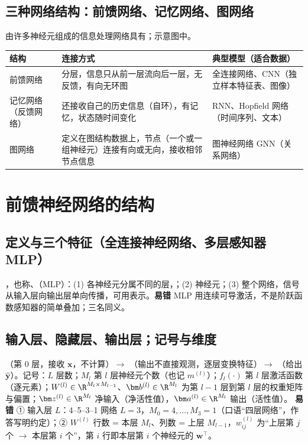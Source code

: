 \subsection{三种网络结构：前馈网络、记忆网络、图网络}
由许多神经元组成的信息处理网络具有；示意图中。
\begin{center}\small\renewcommand{\arraystretch}{1.1}
\begin{tabularx}{\linewidth}{@{}p{3.1cm}Lp{4.6cm}@{}}
\toprule
结构 & 连接方式 & 典型模型（适合数据） \\
\midrule
前馈网络 & 分层，信息只从前一层流向后一层，无反馈，有向无环图 & 全连接网络、CNN（独立样本特征表、图像） \\
记忆网络（反馈网络） & 还接收自己的历史信息（自环），有记忆，状态随时间变化 & RNN、Hopfield 网络（时间序列、文本） \\
图网络 & 定义在图结构数据上，节点（一个或一组神经元）连接有向或无向，接收相邻节点信息 & 图神经网络 GNN（关系网络） \\
\bottomrule
\end{tabularx}
\end{center}

\section{前馈神经网络的结构}

\subsection{定义与三个特征（全连接神经网络、多层感知器 MLP）}
，也称、（MLP）：(1) 各神经元分属不同的层，；(2) 神经元；(3) 整个网络，信号从输入层向输出层单向传播，可用表示。\textbf{易错} MLP 用连续可导激活，不是阶跃函数感知器的简单叠加；三名同义。

\subsection{输入层、隐藏层、输出层；记号与维度}
（第 0 层，接收 $\bm x$，不计算）$\to$ （输出不直接观测，逐层变换特征）$\to$ （给出 $\hat{\bm y}$）。记号：$L$ 层数；$M_l$ 第 $l$ 层神经元个数（也记 $m^{(l)}$）；$f_l(\cdot)$ 第 $l$ 层激活函数（逐元素）；$W^{(l)}\in\R^{M_l\times M_{l-1}}$、$\bm b^{(l)}\in\R^{M_l}$ 为第 $l-1$ 层到第 $l$ 层的权重矩阵与偏置；$\bm z^{(l)}\in\R^{M_l}$ 净输入（净活性值），$\bm a^{(l)}\in\R^{M_l}$ 输出（活性值）。
\textbf{易错} ① 输入层 $L$：4--5--3--1 网络 $L=3$，$M_0=4,\dots,M_3=1$（口语“四层网络”，作答写明约定）；② $W^{(l)}$ 行数 = 本层 $M_l$、列数 = 上层 $M_{l-1}$，$w^{(l)}_{ij}$ 为“上层第 $j$ 个 $\to$ 本层第 $i$ 个”，第 $i$ 行即本层第 $i$ 个神经元的 $\bm w^\top$。


